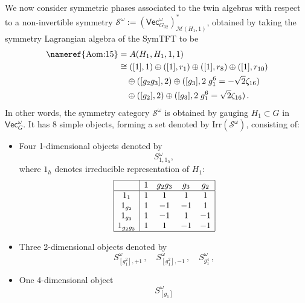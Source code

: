 \documentclass[aps,twocolumn,prx,floatfix,preprintnumbers, nofootinbib,10pt]{revtex4-2}
\numberwithin{equation}{section}
\theoremstyle{definition}
\newcommand{\be}{\begin{equation}}
\newcommand{\ee}{\end{equation}}
\newcommand{\nn}{\nonumber}
\newcommand{\cM}{\mathcal{M}}
\newcommand{\cS}{\mathcal{S}}
\renewcommand{\Vec}{\mathsf{Vec}}
\begin{document}
We now consider symmetric phases associated to the twin algebras with respect to a non-invertible symmetry $\cS^\omega:=(\Vec_{G_{32}}^\omega)_{\cM(H_1,1)}^*$, obtained by taking the symmetry Lagrangian algebra of the SymTFT to be 
\begin{align}
    \text{\nameref{Aom:15}}&=A(H_1, H_1, 1, 1) \\
    &\cong ([1],1) \oplus ([1],r_1) \oplus ([1],r_8) \oplus ([1],r_{10}) \nn\\ 
    & \quad \oplus ([g_2g_3],2) \oplus ([g_3],2\;g_1^6=-\sqrt{2}\zeta_{16})  \nn \\
    & \quad \oplus ([g_2],2) \oplus ([g_3],2\;g_1^6=\sqrt{2}\zeta_{16})\,. 
\end{align}
In other words, the symmetry category $\cS^\omega$ is obtained by gauging $H_1\subset G$ in $\Vec_G^\omega$. It has 8 simple objects, forming a set denoted by $\text{Irr}(\cS^\omega)$, consisting of:
\begin{itemize}
    \item Four 1-dimensional objects denoted by
    \begin{equation}
        S^\omega_{1,1_h},
    \end{equation}
    where $1_h$ denotes irreducible representation of $H_1$:
    \be
    \label{eqn:1drep-H1}
        \begin{array}{|c|c c c c|}\hline
         & 1 & g_2 g_3 & g_3 & g_2 \\
         \hline
    1_1 & 1 & 1 & 1 & 1 \\
    1_{g_2} & 1 & -1 & -1 & 1 \\
    1_{g_3} & 1 & -1 & 1 & -1 \\
    1_{g_2g_3} & 1 & 1 & -1 & -1 \\
    \hline
        \end{array}
    \ee
    
    \item Three 2-dimensional objects denoted by
    \begin{equation}
        S^{\omega}_{[g_1^2], +1}\,, \quad S^{\omega}_{[g_1^2], -1}\,, \quad S^\omega_{g_1^4}\,,
    \end{equation}

    \item One 4-dimensional object
    \begin{equation}
        S^\omega_{[g_1]}
    \end{equation}
\end{itemize}
\end{document}
